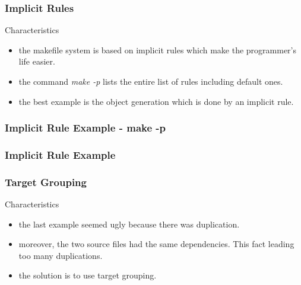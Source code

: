 \documentclass{beamer}
\begin{document}

\begin{frame}
  \frametitle{Implicit Rules}

  \begin{block}{Characteristics}
    \begin{itemize}
      \item<1->
        the makefile system is based on implicit rules which make the
        programmer's life easier.
      \item<1->
        the command \textit{make -p} lists the entire list of rules including
        default ones.
      \item<1->
        the best example is the object generation which is done by an implicit
        rule.
    \end{itemize}
  \end{block}

\end{frame}


\begin{frame}
  \frametitle{Implicit Rule Example - {\small make -p}}

  \begin{Example}
    
  \end{Example}

  \begin{Example}
    
  \end{Example}

\end{frame}


\begin{frame}
  \frametitle{Implicit Rule Example}

  \begin{Example}
    
  \end{Example}

\end{frame}


\begin{frame}
  \frametitle{Target Grouping}

  \begin{block}{Characteristics}
    \begin{itemize}
      \item
        the last example seemed ugly because there was duplication.
      \item
        moreover, the two source files had the same dependencies. This
        fact leading too many duplications.
      \item
        the solution is to use target grouping.
    \end{itemize}
  \end{block}

\end{frame}
\end{document}
